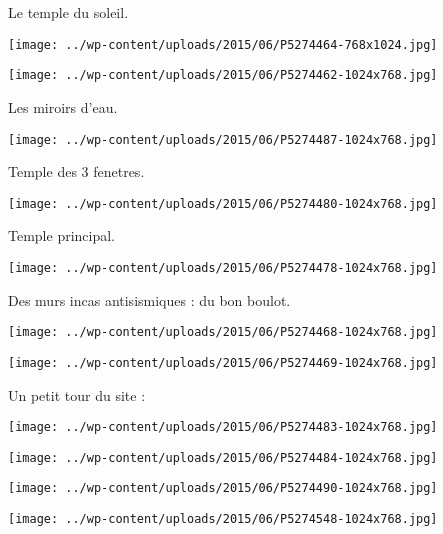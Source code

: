  Le temple du soleil. \newline
 \newline
\centerline{\texttt{[image: ../wp-content/uploads/2015/06/P5274464-768x1024.jpg]} } 
 \newline
 \newline
\centerline{\texttt{[image: ../wp-content/uploads/2015/06/P5274462-1024x768.jpg]} } 
 \newline
 Les miroirs d'eau. \newline
 \newline
\centerline{\texttt{[image: ../wp-content/uploads/2015/06/P5274487-1024x768.jpg]} } 
 \newline
 Temple des 3 fenetres. \newline
 \newline
\centerline{\texttt{[image: ../wp-content/uploads/2015/06/P5274480-1024x768.jpg]} } 
 \newline
 Temple principal. \newline
 \newline
\centerline{\texttt{[image: ../wp-content/uploads/2015/06/P5274478-1024x768.jpg]} } 
 \newline
 Des murs incas antisismiques : du bon boulot. \newline
 \newline
\centerline{\texttt{[image: ../wp-content/uploads/2015/06/P5274468-1024x768.jpg]} } 
 \newline
 \newline
\centerline{\texttt{[image: ../wp-content/uploads/2015/06/P5274469-1024x768.jpg]} } 
 \newline
 Un petit tour du site : \newline
 \newline
\centerline{\texttt{[image: ../wp-content/uploads/2015/06/P5274483-1024x768.jpg]} } 
 \newline
 \newline
\centerline{\texttt{[image: ../wp-content/uploads/2015/06/P5274484-1024x768.jpg]} } 
 \newline
 \newline
\centerline{\texttt{[image: ../wp-content/uploads/2015/06/P5274490-1024x768.jpg]} } 
 \newline
 \newline
\centerline{\texttt{[image: ../wp-content/uploads/2015/06/P5274548-1024x768.jpg]} } 
